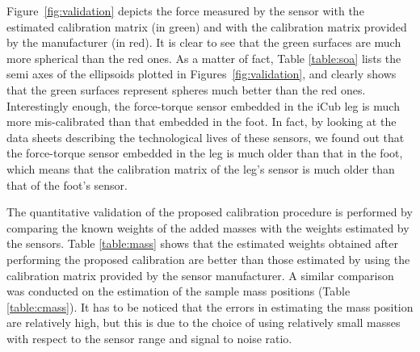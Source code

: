 Figure~\ref{fig:validation} depicts the force measured by the sensor with the estimated calibration matrix (in green)
and with the calibration matrix provided by the manufacturer (in red). It is clear to see that the green surfaces are much more spherical than the red ones.
As a matter of fact, Table \ref{table:soa} lists the semi axes of the ellipsoids plotted in Figures~\ref{fig:validation}, and clearly shows 
that the green surfaces represent spheres much better than the red ones. 
Interestingly enough, the force-torque sensor embedded in the iCub leg is much more mis-calibrated than that embedded in 
the foot. In fact, by looking at the data sheets describing the technological lives of these sensors, we found out that the force-torque sensor embedded in
the leg is much older than that in the foot, which means that the calibration matrix of the leg's sensor is much older than that of the foot's sensor.

The quantitative validation of the proposed calibration procedure is performed by comparing the known weights of the added masses with the weights estimated by the sensors. 
Table \ref{table:mass} shows that the estimated weights obtained after performing the proposed calibration are better than those estimated by using the calibration matrix
provided by the sensor manufacturer. A similar comparison was conducted on the estimation of the sample mass positions (Table \ref{table:cmass}). It has to be noticed that the errors in estimating the mass position are relatively high, but this is due to the choice of using relatively small masses with respect to the sensor range and signal to noise ratio.

